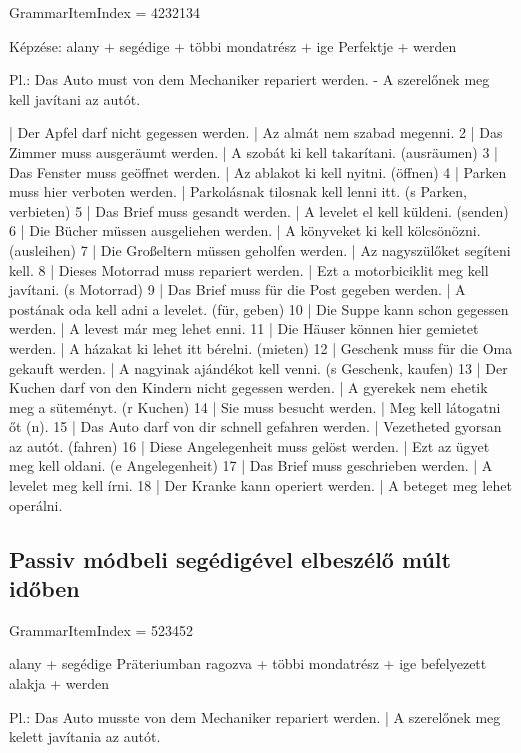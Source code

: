 \documentclass{article}
\newenvironment{desc}{\verbatim}{\endverbatim}
\newenvironment{exmp}{\verbatim}{\endverbatim}
\begin{document}
GrammarItemIndex = 4232134

\begin{desc}
Képzése:
alany + segédige + többi mondatrész + ige Perfektje + werden

Pl.: Das Auto must von dem Mechaniker repariert werden. - A szerelőnek meg kell javítani az autót.
\end{desc}

\begin{exmp}
1 | Der Apfel darf nicht gegessen werden. | Az almát nem szabad megenni.
2 | Das Zimmer muss ausgeräumt werden. | A szobát ki kell takarítani. (ausräumen)
3 | Das Fenster muss geöffnet werden. | Az ablakot ki kell nyitni. (öffnen)
4 | Parken muss hier verboten werden. | Parkolásnak tilosnak kell lenni itt. (s Parken, verbieten)
5 | Das Brief muss gesandt werden. | A levelet el kell küldeni. (senden)
6 | Die Bücher müssen ausgeliehen werden. | A könyveket ki kell kölcsönözni. (ausleihen)
7 | Die Großeltern müssen geholfen werden. | Az nagyszülőket segíteni kell.
8 | Dieses Motorrad muss repariert werden. | Ezt a motorbiciklit meg kell javítani. (s Motorrad)
9 | Das Brief muss für die Post gegeben werden. | A postának oda kell adni a levelet. (für, geben)
10 | Die Suppe kann schon gegessen werden. | A levest már meg lehet enni.
11 | Die Häuser können hier gemietet werden. | A házakat ki lehet itt bérelni. (mieten)
12 | Geschenk muss für die Oma gekauft werden. | A nagyinak ajándékot kell venni. (s Geschenk, kaufen)
13 | Der Kuchen darf von den Kindern nicht gegessen werden. | A gyerekek nem ehetik meg a süteményt. (r Kuchen)
14 | Sie muss besucht werden. | Meg kell látogatni őt (n).
15 | Das Auto darf von dir schnell gefahren werden. | Vezetheted gyorsan az autót. (fahren)
16 | Diese Angelegenheit muss gelöst werden. | Ezt az ügyet meg kell oldani. (e Angelegenheit)
17 | Das Brief muss geschrieben werden. | A levelet meg kell írni.
18 | Der Kranke kann operiert werden. | A beteget meg lehet operálni.
\end{exmp}

\subsection{Passiv módbeli segédigével elbeszélő múlt időben}

GrammarItemIndex = 523452

\begin{desc}
alany + segédige Präteriumban ragozva + többi mondatrész + ige befelyezett alakja + werden

Pl.: Das Auto musste von dem Mechaniker repariert werden. | A szerelőnek meg kelett javítania az autót.
\end{desc}
\end{document}
